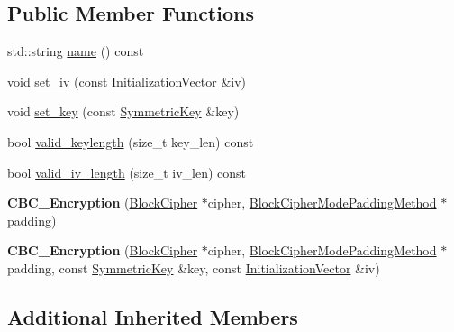 \subsection*{Public Member Functions}
\begin{DoxyCompactItemize}
\item 
std\-::string \hyperlink{classBotan_1_1CBC__Encryption_a273099d317b04ca1ffdd8f29bbb75905}{name} () const 
\item 
void \hyperlink{classBotan_1_1CBC__Encryption_a1601ec129b8c9ac5fe445d54c9963103}{set\-\_\-iv} (const \hyperlink{namespaceBotan_ab6a07e859c4e3a2ccfd68308ec89497e}{Initialization\-Vector} \&iv)
\item 
void \hyperlink{classBotan_1_1CBC__Encryption_ae518dcded64d14a5a843148749c2c1fc}{set\-\_\-key} (const \hyperlink{namespaceBotan_a00c78597211d5c63b63e2a57ddb96d38}{Symmetric\-Key} \&key)
\item 
bool \hyperlink{classBotan_1_1CBC__Encryption_af85353cf52cf74d6a8991ec6391a9f45}{valid\-\_\-keylength} (size\-\_\-t key\-\_\-len) const 
\item 
bool \hyperlink{classBotan_1_1CBC__Encryption_a64f47bae5cc43848d7bf3179d88595ec}{valid\-\_\-iv\-\_\-length} (size\-\_\-t iv\-\_\-len) const 
\item 
\hypertarget{classBotan_1_1CBC__Encryption_a7d5c5652b117756e61e47faf32708530}{{\bfseries C\-B\-C\-\_\-\-Encryption} (\hyperlink{classBotan_1_1BlockCipher}{Block\-Cipher} $\ast$cipher, \hyperlink{classBotan_1_1BlockCipherModePaddingMethod}{Block\-Cipher\-Mode\-Padding\-Method} $\ast$padding)}\label{classBotan_1_1CBC__Encryption_a7d5c5652b117756e61e47faf32708530}

\item 
\hypertarget{classBotan_1_1CBC__Encryption_a1799a29d04926b24a8b16d27689ea1b4}{{\bfseries C\-B\-C\-\_\-\-Encryption} (\hyperlink{classBotan_1_1BlockCipher}{Block\-Cipher} $\ast$cipher, \hyperlink{classBotan_1_1BlockCipherModePaddingMethod}{Block\-Cipher\-Mode\-Padding\-Method} $\ast$padding, const \hyperlink{namespaceBotan_a00c78597211d5c63b63e2a57ddb96d38}{Symmetric\-Key} \&key, const \hyperlink{namespaceBotan_ab6a07e859c4e3a2ccfd68308ec89497e}{Initialization\-Vector} \&iv)}\label{classBotan_1_1CBC__Encryption_a1799a29d04926b24a8b16d27689ea1b4}

\end{DoxyCompactItemize}
\subsection*{Additional Inherited Members}


